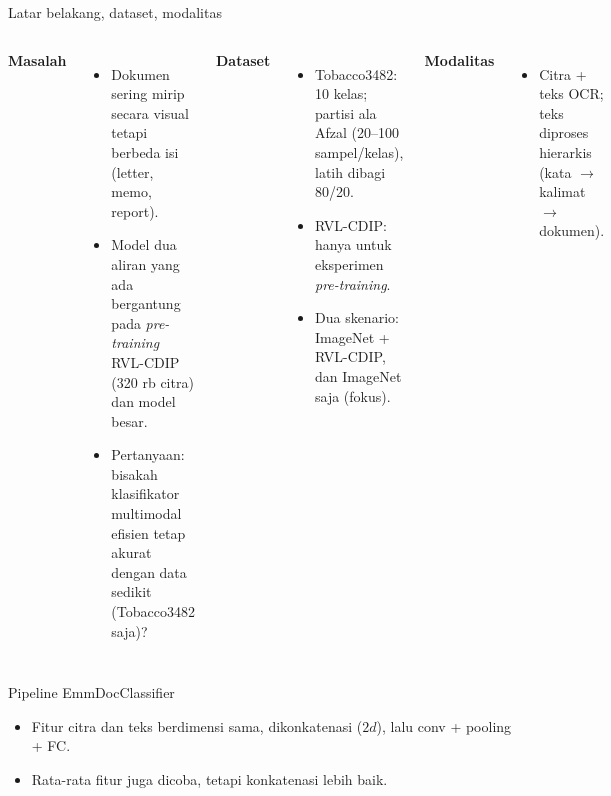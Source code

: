 \documentclass[aspectratio=169,10pt]{beamer}
\newcommand\kecil{\fontsize{8}{9.5}\selectfont}
\begin{document}
\begin{frame}{Latar belakang, dataset, modalitas}
  \begin{columns}[T]
    \textbf{Masalah}
    \begin{itemize}\kecil
      \item Dokumen sering mirip secara visual tetapi berbeda isi (letter, memo, report).
      \item Model dua aliran yang ada bergantung pada \emph{pre-training} RVL-CDIP (320 rb citra) dan model besar.
      \item Pertanyaan: bisakah klasifikator multimodal \alert{efisien} tetap akurat dengan \alert{data sedikit} (Tobacco3482 saja)?
    \end{itemize}
    \textbf{Dataset}
    \begin{itemize}\kecil
      \item Tobacco3482: 10 kelas; partisi ala Afzal (20--100 sampel/kelas), latih dibagi 80/20.
      \item RVL-CDIP: hanya untuk eksperimen \emph{pre-training}.
      \item Dua skenario: ImageNet + RVL-CDIP, dan ImageNet saja (fokus).
    \end{itemize}
    \textbf{Modalitas}
    \begin{itemize}\kecil
      \item Citra + teks OCR; teks diproses hierarkis (kata $\to$ kalimat $\to$ dokumen).
    \end{itemize}
  \end{columns}
\end{frame}

\begin{frame}{Pipeline EmmDocClassifier}
  
  \vspace{6pt}
  \begin{itemize}\kecil
    \item Fitur citra dan teks berdimensi sama, dikonkatenasi ($2d$), lalu conv + pooling + FC.
    \item Rata-rata fitur juga dicoba, tetapi konkatenasi lebih baik.
  \end{itemize}
\end{frame}
\end{document}
